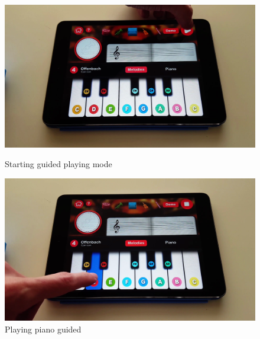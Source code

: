 \begin{figure}[ht!]
  \centering
  \includegraphics[width=350pt]{graphics/game-play/select_guided_mode.png}
  \vspace{0.05cm}
  \caption{Starting guided playing mode}
  \vspace{1cm}

  \includegraphics[width=350pt]{graphics/game-play/playing_piano_guided.png}
  \vspace{0.05cm}
  \caption{Playing piano guided}
\end{figure}

